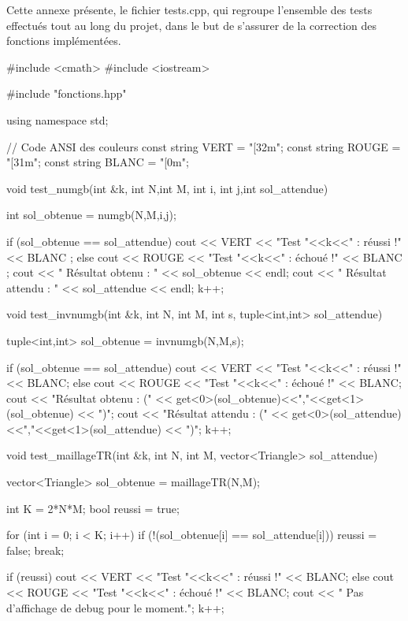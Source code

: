 \label{sec:tests}


Cette annexe présente, le fichier tests.cpp, qui regroupe l'ensemble des tests effectués tout au long du projet, dans le but de s'assurer de la correction des fonctions implémentées.

\vspace{0.8em}


\begin{codeblock}

#include <cmath>
#include <iostream>

#include "fonctions.hpp"

using namespace std;


// Code ANSI des couleurs
const string VERT = "[32m";
const string ROUGE = "[31m";
const string BLANC = "[0m";


void test_numgb(int &k, int N,int M, int i, int j,int sol_attendue){
    int sol_obtenue = numgb(N,M,i,j);

    if (sol_obtenue == sol_attendue){
        cout << VERT << "Test "<<k<<" : réussi !\n"<< BLANC ;
    } else {
        cout << ROUGE << "Test "<<k<<" : échoué !\n" << BLANC ;
        cout << "   Résultat obtenu : " << sol_obtenue << endl;
        cout << "   Résultat attendu : " << sol_attendue << endl;
    }
    k++;
}


void test_invnumgb(int &k, int N, int M, int s, tuple<int,int> sol_attendue){
    tuple<int,int> sol_obtenue = invnumgb(N,M,s);

    if (sol_obtenue == sol_attendue){
        cout << VERT << "Test "<<k<<" : réussi !\n" << BLANC;
    } else {
        cout << ROUGE << "Test "<<k<<" : échoué !\n" << BLANC;
        cout << "Résultat obtenu : (" << get<0>(sol_obtenue)<<","<<get<1>(sol_obtenue) << ")\n";
        cout << "Résultat attendu : (" << get<0>(sol_attendue)<<","<<get<1>(sol_attendue) << ")\n";
    }
    k++;
}


void test_maillageTR(int &k, int N, int M, vector<Triangle> sol_attendue){
    vector<Triangle> sol_obtenue = maillageTR(N,M);

    int K = 2*N*M;
    bool reussi = true;

    for (int i = 0; i < K; i++){
        if (!(sol_obtenue[i] == sol_attendue[i])){
            reussi = false;
            break;
        }
    }

    if (reussi){
        cout << VERT << "Test "<<k<<" : réussi !\n" << BLANC;
    } else {
        cout << ROUGE << "Test "<<k<<" : échoué !\n" << BLANC;
        cout << "   Pas d'affichage de debug pour le moment.\n";
    }
    k++;

}
\end{codeblock}
